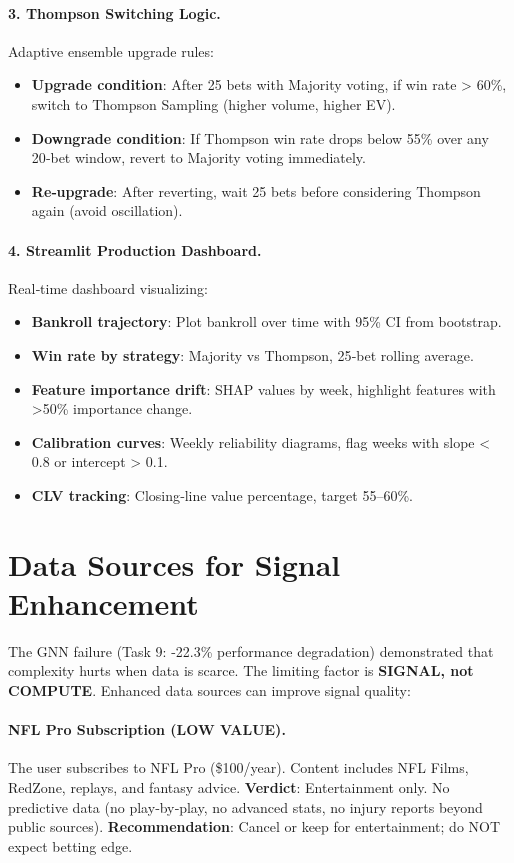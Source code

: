 \paragraph{3. Thompson Switching Logic.}
Adaptive ensemble upgrade rules:
\begin{itemize}
\item \textbf{Upgrade condition}: After 25 bets with Majority voting, if win rate > 60\%, switch to Thompson Sampling (higher volume, higher EV).
\item \textbf{Downgrade condition}: If Thompson win rate drops below 55\% over any 20‑bet window, revert to Majority voting immediately.
\item \textbf{Re‑upgrade}: After reverting, wait 25 bets before considering Thompson again (avoid oscillation).
\end{itemize}

\paragraph{4. Streamlit Production Dashboard.}
Real‑time dashboard visualizing:
\begin{itemize}
\item \textbf{Bankroll trajectory}: Plot bankroll over time with 95\% CI from bootstrap.
\item \textbf{Win rate by strategy}: Majority vs Thompson, 25‑bet rolling average.
\item \textbf{Feature importance drift}: SHAP values by week, highlight features with >50\% importance change.
\item \textbf{Calibration curves}: Weekly reliability diagrams, flag weeks with slope < 0.8 or intercept > 0.1.
\item \textbf{CLV tracking}: Closing‑line value percentage, target 55--60\%.
\end{itemize}

\section{Data Sources for Signal Enhancement}
\label{sec:data_sources}

The GNN failure (Task 9: -22.3\% performance degradation) demonstrated that complexity hurts when data is scarce. The limiting factor is \textbf{SIGNAL, not COMPUTE}. Enhanced data sources can improve signal quality:

\paragraph{NFL Pro Subscription (LOW VALUE).}
The user subscribes to NFL Pro (\$100/year). Content includes NFL Films, RedZone, replays, and fantasy advice. \textbf{Verdict}: Entertainment only. No predictive data (no play‑by‑play, no advanced stats, no injury reports beyond public sources). \textbf{Recommendation}: Cancel or keep for entertainment; do NOT expect betting edge.

